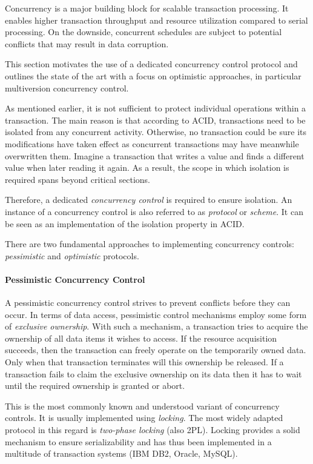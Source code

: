 Concurrency is a major building block for scalable transaction processing. It
enables higher transaction throughput and resource utilization compared to
serial processing. On the downside, concurrent schedules are subject to
potential conflicts that may result in data corruption.

This section motivates the use of a dedicated concurrency control protocol and
outlines the state of the art with a focus on optimistic approaches, in
particular multiversion concurrency control.

As mentioned earlier, it is not sufficient to protect individual operations
within a transaction. The main reason is that according to ACID, transactions
need to be isolated from any concurrent activity. Otherwise, no transaction
could be sure its modifications have taken effect as concurrent transactions may
have meanwhile overwritten them. Imagine a transaction that writes a value and
finds a different value when later reading it again. As a result, the scope in
which isolation is required spans beyond critical sections.

Therefore, a dedicated \emph{concurrency control} is required to ensure
isolation. An instance of a concurrency control is also referred to as
\emph{protocol} or \emph{scheme}. It can be seen as an implementation of the
isolation property in ACID.


There are two fundamental approaches to implementing concurrency controls:
\emph{pessimistic} and \emph{optimistic} protocols.

\paragraph{Pessimistic Concurrency Control} %
A pessimistic concurrency control strives to prevent conflicts before they can
occur. In terms of data access, pessimistic control mechanisms employ some form
of \emph{exclusive ownership}. With such a mechanism, a transaction tries to
acquire the ownership of all data items it wishes to access. If the resource
acquisition succeeds, then the transaction can freely operate on the temporarily
owned data. Only when that transaction terminates will this ownership be
released. If a transaction fails to claim the exclusive ownership on its data
then it has to wait until the required ownership is granted or abort.

This is the most commonly known and understood variant of concurrency controls.
It is usually implemented using \emph{locking}. The most widely adapted protocol
in this regard is \emph{two-phase locking} (also 2PL). Locking provides a solid
mechanism to ensure serializability and has thus been implemented in a multitude
of transaction systems (IBM DB2, Oracle, MySQL).

